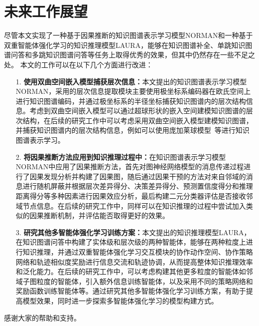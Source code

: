 \documentclass[algorithmlist, AutoFakeBold, AutoFakeSlant, figurelist, tablelist, nomlist, engineering]{seuthesix}
\begin{document}
\section{未来工作展望}
尽管本文实现了一种基于因果推断的知识图谱表示学习模型NORMAN和一种基于双重智能体强化学习的知识推理模型LAURA，能够在知识图谱补全、单跳知识图谱问答和多跳知识图谱问答等任务上取得优秀的效果，但其中仍然存在一些不足之处。
本文的工作可以在以下几个方面进行改进：
\begin{itemize}
  \item [1.]\textbf{使用双曲空间嵌入模型捕获层次信息：}本文提出的知识图谱表示学习模型NORMAN，采用的层次信息提取模块主要使用极坐标系编码器在欧氏空间上进行知识图谱编码，并通过极坐标系的半径坐标捕获知识图谱内的层次结构信息。考虑到双曲空间嵌入模型可以通过超球形状的嵌入空间建模知识图谱的层次结构，在后续的研究工作中可以考虑采用双曲空间嵌入模型建模知识图谱，并捕获知识图谱内的层次结构信息，例如可以使用庞加莱球模型~\cite{abramowicz2002poincare}等进行知识图谱表示学习。
  \item [2.]\textbf{将因果推断方法应用到知识推理过程中：}在知识图谱表示学习模型NORMAN中应用了因果推断方法，首先对图神经网络模型的消息传递过程进行了因果发现分析并构建了因果图，随后通过因果干预的方法对来自邻域的消息进行随机屏蔽并根据层次差异得分、决策差异得分、预测置信度得分和推理距离得分等多种因素进行因果效应分析，最后构建二元分类器评估是否接收邻域节点信息。在后续的研究工作中，同样可以在知识推理的过程中尝试加入类似的因果推断机制，并评估能否取得更好的效果。
  \item [3.]\textbf{研究其他多智能体强化学习训练方案：}本文提出的知识推理模型LAURA，在知识图谱问答中构建了实体级和层次级的两种智能体，能够在两种粒度上进行知识推理，并通过双重智能体强化学习交互模块的协作动作空间、协作策略网络和轨迹相似度奖励进行信息交流和轨迹协调，从而提高整体知识推理效率和泛化能力。在后续的研究工作中，可以考虑构建其他更多粒度的智能体如邻域子图粒度的智能体，引入额外信息训练智能体，以及采用不同的策略网络和奖励函数训练智能体等。通过研究其他多智能体强化学习训练方案，有助于提高模型效果，同时进一步探索多智能体强化学习的模型构建方式。
\end{itemize}

\acknowledgement
感谢大家的帮助和支持。


% 
% 
% 
\end{document}
